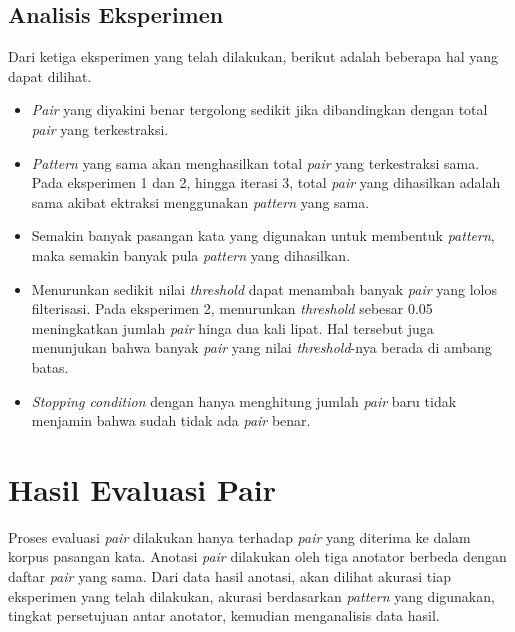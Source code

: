 \subsection{Analisis Eksperimen}
Dari ketiga eksperimen yang telah dilakukan, berikut adalah beberapa hal yang dapat dilihat.
\begin{itemize}
  \item \textit{Pair} yang diyakini benar tergolong sedikit jika dibandingkan dengan total \textit{pair} yang terkestraksi.
  \item \textit{Pattern} yang sama akan menghasilkan total \textit{pair} yang terkestraksi sama. Pada eksperimen 1 dan 2, hingga iterasi 3, total \textit{pair} yang dihasilkan adalah sama akibat ektraksi menggunakan \textit{pattern} yang sama.
  \item Semakin banyak pasangan kata yang digunakan untuk membentuk \textit{pattern}, maka semakin banyak pula \textit{pattern} yang dihasilkan.
  \item Menurunkan sedikit nilai \textit{threshold} dapat menambah banyak \textit{pair} yang lolos filterisasi. Pada eksperimen 2, menurunkan \textit{threshold} sebesar 0.05 meningkatkan jumlah \textit{pair} hinga dua kali lipat. Hal tersebut juga menunjukan bahwa banyak \textit{pair} yang nilai \textit{threshold}-nya berada di ambang batas. 
  \item \textit{Stopping condition} dengan hanya menghitung jumlah \textit{pair} baru tidak menjamin bahwa sudah tidak ada \textit{pair} benar.   
\end{itemize}

\section{Hasil Evaluasi Pair}
Proses evaluasi \textit{pair} dilakukan hanya terhadap \textit{pair} yang diterima ke dalam korpus pasangan kata. Anotasi \textit{pair} dilakukan oleh tiga anotator berbeda dengan daftar \textit{pair} yang sama. Dari data hasil anotasi, akan dilihat akurasi tiap eksperimen yang telah dilakukan, akurasi berdasarkan \textit{pattern} yang digunakan, tingkat persetujuan antar anotator, kemudian menganalisis data hasil.

